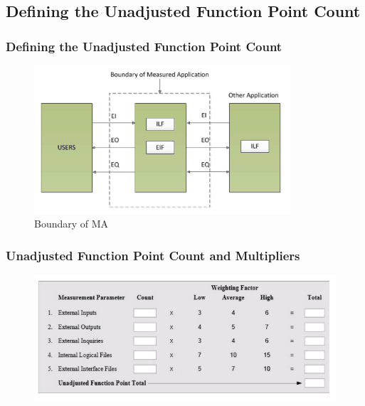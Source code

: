 \documentclass{beamer}
\begin{document}
\subsection{Defining the Unadjusted Function Point Count}
\frame
{
	\frametitle{Defining the Unadjusted Function Point Count}
	\begin{figure}[h!]
  		\centering
    	\includegraphics[width=0.85\textwidth]{../Images/FP_model.png}
		\caption{Boundary of MA}
	\end{figure}
}

\frame
{
	\frametitle{Unadjusted Function Point Count and Multipliers}
	\begin{figure}[h!]
  		\centering
    	\includegraphics[width=\textwidth]{../Images/FP.png}
	\end{figure}
}
\end{document}
